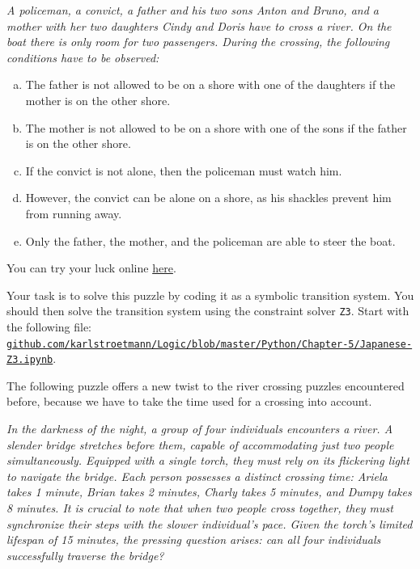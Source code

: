 \begin{minipage}{0.95\linewidth}
{\sl
  A policeman, a convict, a father and his two sons Anton and Bruno, and a mother with her two daughters Cindy and Doris have to cross a river. On the boat there is only room for two passengers.
During the crossing, the following conditions have to be observed:
\begin{enumerate}[(a)]
\item The father is not allowed to be on a shore with one of the daughters if the mother is on the other shore.
\item The mother is not allowed to be on a shore with one of the sons if the father is on the other shore.
\item If the convict is not alone, then the policeman must watch him.
\item However, the convict can be alone on a shore, as his shackles prevent him from running away.
\item Only the father, the mother, and the policeman are able to steer the boat.
\end{enumerate}}
\end{minipage}
\vspace*{0.2cm}

\noindent
You can try your luck online \href{https://flashmuseum.org/iq-%E9%81%8E%E6%B2%B3%E9%81%8A%E6%88%B2/}{here}.

\noindent
Your task is to solve this puzzle by coding it as a symbolic transition system.  You should then solve the
transition system using the constraint solver \texttt{Z3}.
Start with the following file:
\\[0.2cm]
\href{https://github.com/karlstroetmann/Logic/blob/master/Python/Chapter-5/Japanese-Z3.ipynb}{\small\texttt{github.com/karlstroetmann/Logic/blob/master/Python/Chapter-5/Japanese-Z3.ipynb}}.
\eox

\exerciseEng
The following puzzle offers a new twist to the river crossing puzzles encountered before, because we have to
take the time used for a crossing into account.

\begin{minipage}{0.95\linewidth}
  {\sl
    In the darkness of the night, a group of four individuals encounters a river. A slender bridge stretches
    before them, capable of accommodating just two people simultaneously. Equipped with a single torch, they
    must rely on its flickering light to navigate the bridge. Each person possesses a distinct crossing time:
    Ariela takes 1 minute, Brian takes 2 minutes, Charly takes 5 minutes, and Dumpy takes 8 minutes. It is
    crucial to note that when two people cross together, they must synchronize their steps with the slower
    individual's pace. Given the torch's limited lifespan of 15 minutes, the pressing question arises: can all
    four individuals successfully traverse the bridge? 
  }
\end{minipage}

